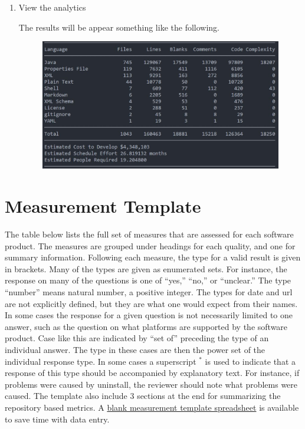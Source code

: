\documentclass[letterpaper,cleveref]{lipics-v2019}
\begin{document}
\begin{enumerate}
\item View the analytics

The results will be appear something like the following.

\begin{figure}[!ht]
\includegraphics[scale=0.5]{scc-demo.JPG}
\end{figure}

\end{enumerate}

\newpage

\section{Measurement Template} \label{SecGradingTemplate}

The table below lists the full set of measures that are assessed for each
software product.  The measures are grouped under headings for each quality, and
one for summary information.  Following each measure, the type for a valid
result is given in brackets.  Many of the types are given as enumerated sets.
For instance, the response on many of the questions is one of ``yes,'' ``no,''
or ``unclear.''  The type ``number'' means natural number, a positive integer.  The
types for date and url are not explicitly defined, but they are what one would
expect from their names.  In some cases the response for a given question is not
necessarily limited to one answer, such as the question on what platforms are
supported by the software product.  Case like this are indicated by ``set of''
preceding the type of an individual answer.  The type in these cases are then
the power set of the individual response type.  In some cases a superscript $^*$
is used to indicate that a response of this type should be accompanied by
explanatory text.  For instance, if problems were caused by uninstall, the
reviewer should note what problems were caused.  %
The template also include 3 sections at the end for summarizing the repository
based metrics.  A
\href{https://github.com/smiths/AIMSS/blob/master/StateOfPractice/Methodology/Combined_MeasurementTemplate_EmpiricalMeasures.xlsx}
{blank measurement template spreadsheet} is available to save time with data
entry.
\end{document}
